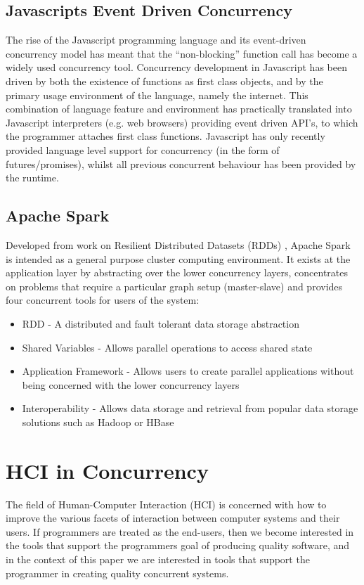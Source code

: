 \documentclass{sig-alternate}
\begin{document}
\subsection{Javascripts Event Driven Concurrency}
The rise of the Javascript programming language and its event-driven concurrency model has meant that the ``non-blocking'' function call has become a widely used concurrency tool. Concurrency development in Javascript has been driven by both the existence of functions as first class objects, and by the primary usage environment of the language, namely the internet. This combination of language feature and environment has practically translated into Javascript interpreters (e.g. web browsers) providing event driven API's, to which the programmer attaches first class functions. Javascript has only recently provided language level support for concurrency (in the form of futures/promises), whilst all previous concurrent behaviour has been provided by the runtime.

\subsection{Apache Spark}
Developed from work on Resilient Distributed Datasets (RDDs)  \cite{zaharia14:_archit_fast_gener_data_proces_large_clust},  Apache Spark is intended as a general purpose cluster computing environment. It exists at the application layer by abstracting over the lower concurrency layers, concentrates on problems that require a particular graph setup (master-slave) and provides four concurrent tools for users of the system:

\begin{itemize}
\item RDD - A distributed and fault tolerant data storage abstraction
\item Shared Variables - Allows parallel operations to access shared state
\item Application Framework - Allows users to create parallel applications without being concerned with the lower concurrency layers
\item Interoperability - Allows data storage and retrieval from popular data storage solutions such as Hadoop or HBase
\end{itemize}

\section{HCI in Concurrency}
The field of Human-Computer Interaction (HCI) is concerned with how to improve the various facets of interaction between computer systems and their users. If programmers are treated as the end-users, then we become interested in the tools that support the programmers goal of producing quality \cite{9126} software, and in the context of this paper we are interested in tools that support the programmer in creating quality concurrent systems.
\end{document}
